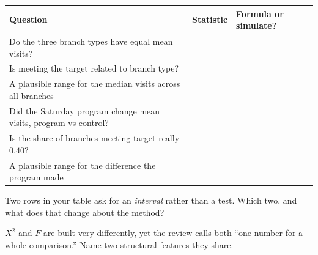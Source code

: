 \documentclass[11pt]{article}
\newcommand{\answerspace}[1]{\vspace{#1}}
\begin{document}
\begin{questions}
\begin{center}
\renewcommand{\arraystretch}{2}
\begin{tabularx}{\linewidth}{LLL}
\toprule
\textbf{Question} & \textbf{Statistic} & \textbf{Formula or simulate?} \\
\midrule
Do the three branch types have equal mean visits? & & \\
Is meeting the target related to branch type? & & \\
A plausible range for the median visits across all branches & & \\
Did the Saturday program change mean visits, program vs control? & & \\
Is the share of branches meeting target really $0.40$? & & \\
A plausible range for the difference the program made & & \\
\bottomrule
\end{tabularx}
\end{center}

\begin{parts}
\item Two rows in your table ask for an \emph{interval} rather than a test. Which two, and what
does that change about the method?
\answerspace{3.5em}

\item $X^2$ and $F$ are built very differently, yet the review calls both ``one number for a whole
comparison.'' Name two structural features they share.
\answerspace{4em}
\end{parts}

\end{questions}
\end{document}
